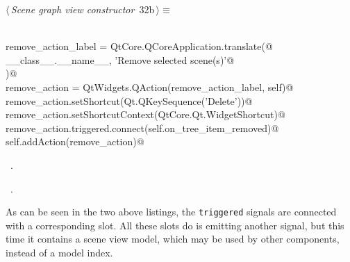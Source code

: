 \documentclass[
    a4paper,      %
    10pt,         %
    openright,    %
    notitlepage,  %
    parskip=half, %
]{scrreprt}       %
\theoremstyle{definition}                    %
\begin{document}
\begin{flushleft} \small
\begin{minipage}{\linewidth}\label{scrap35}\raggedright\small
{} $\langle\,${\itshape Scene graph view constructor}\nobreak\ {\footnotesize {32b}}$\,\rangle\equiv$
\vspace{-1ex}
\begin{list}{}{} \item
\mbox{}\lstinline@@\\
\mbox{}\lstinline@    remove_action_label = QtCore.QCoreApplication.translate(@\\
\mbox{}\lstinline@        __class__.__name__, 'Remove selected scene(s)'@\\
\mbox{}\lstinline@    )@\\
\mbox{}\lstinline@    remove_action = QtWidgets.QAction(remove_action_label, self)@\\
\mbox{}\lstinline@    remove_action.setShortcut(Qt.QKeySequence('Delete'))@\\
\mbox{}\lstinline@    remove_action.setShortcutContext(QtCore.Qt.WidgetShortcut)@\\
\mbox{}\lstinline@    remove_action.triggered.connect(self.on_tree_item_removed)@\\
\mbox{}\lstinline@    self.addAction(remove_action)@\\
\mbox{}\lstinline@@{\NWsep}
\end{list}
\vspace{-1.5ex}
\footnotesize
\begin{list}{}{\setlength{\itemsep}{-\parsep}\setlength{\itemindent}{-\leftmargin}}
\item \NWtxtMacroDefBy\ .
\item \NWtxtMacroRefIn\ .

\item{}
\end{list}
\end{minipage}\vspace{4ex}
\end{flushleft}
As can be seen in the two above listings, the \verb+triggered+ signals are
connected with a corresponding slot. All these slots do is emitting another
signal, but this time it contains a scene view model, which may be used by
other components, instead of a model index.
\end{document}

